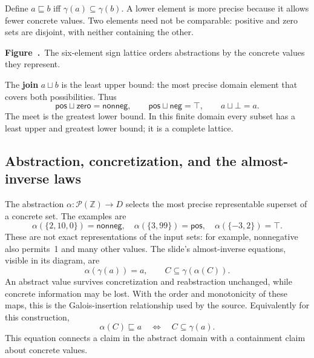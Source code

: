 \documentclass[11pt,a4paper]{article}
\newcommand{\powerset}{\mathcal{P}}
\numberwithin{figure}{section}
\newcommand{\diagramcaption}[1]{\par\smallskip\refstepcounter{figure}\begin{center}\small\textbf{Figure~\thefigure.}~#1\end{center}}
\begin{document}
Define $a\sqsubseteq b$ iff $\gamma(a)\subseteq\gamma(b)$. A lower element is more precise because it allows fewer concrete values. Two elements need not be comparable: positive and zero sets are disjoint, with neither containing the other.

\begin{center}\end{center}
\diagramcaption{The six-element sign lattice orders abstractions by the concrete values they represent.}

The \textbf{join} $a\sqcup b$ is the least upper bound: the most precise domain element that covers both possibilities. Thus
\[
\mathsf{pos}\sqcup\mathsf{zero}=\mathsf{nonneg},\qquad
\mathsf{pos}\sqcup\mathsf{neg}=\top,\qquad
a\sqcup\bot=a.
\]
The meet is the greatest lower bound. In this finite domain every subset has a least upper and greatest lower bound; it is a complete lattice.

\subsection{Abstraction, concretization, and the almost-inverse laws}
The abstraction $\alpha:\powerset(\mathbb Z)\to D$ selects the most precise representable superset of a concrete set. The examples are
\[
\alpha(\{2,10,0\})=\mathsf{nonneg},\quad
\alpha(\{3,99\})=\mathsf{pos},\quad
\alpha(\{-3,2\})=\top.
\]
These are not exact representations of the input sets: for example, nonnegative also permits~1 and many other values. The slide's almost-inverse equations, visible in its diagram, are
\[
\alpha(\gamma(a))=a,\qquad C\subseteq\gamma(\alpha(C)).
\]
An abstract value survives concretization and reabstraction unchanged, while concrete information may be lost. With the order and monotonicity of these maps, this is the Galois-insertion relationship used by the source. Equivalently for this construction,
\[
\alpha(C)\sqsubseteq a\quad\Longleftrightarrow\quad C\subseteq\gamma(a).
\]
This equation connects a claim in the abstract domain with a containment claim about concrete values.
\end{document}
